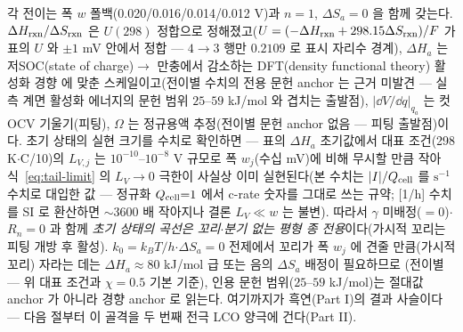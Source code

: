 각 전이는 폭 $w$ 폴백(0.020/0.016/0.014/0.012 V)과 $n=1$, $\Delta S_a=0$ 을 함께 갖는다. $\Delta H_{\mathrm{rxn}}/\Delta S_{\mathrm{rxn}}$
은 $U(298)$ 정합으로 정해졌고($U=(-\Delta H_{\mathrm{rxn}}+298.15\Delta S_{\mathrm{rxn}})/F$ 가 표의 $U$ 와 $\pm1$ mV 안에서 정합 --- $4\!\to\!3$ 행만 $0.2109$ 로 표시 자리수 경계), $\Delta H_a$ 는 저SOC(state of charge)$\to$
만충에서 감소하는 DFT(density functional theory) 활성화 경향\cite{persson2010,persson2010b} 에 맞춘
스케일이고(전이별 수치의 전용 문헌 anchor 는 근거 미발견 --- 실측 계면 활성화 에너지의 문헌 범위
$25$--$59$ kJ/mol 와 겹치는 출발점), $|\dd V/\dd q|_{q_a}$ 는 컷 OCV 기울기(피팅), $\Omega$ 는 정규용액
추정(전이별 문헌 anchor 없음 --- 피팅 출발점)이다.
초기 상태의 실현 크기를 수치로 확인하면 --- 표의 $\Delta H_a$ 초기값에서 대표 조건(298 K$\cdot$C/10)의
$L_{V,j}$ 는 $10^{-10}$--$10^{-8}$ V 규모로 폭 $w_j$(수십 mV)에 비해 무시할 만큼 작아 식~\eqref{eq:tail-limit} 의 $L_V\to0$ 극한이 사실상 이미 실현된다(본 수치는 $|I|/Q_{\mathrm{cell}}$ 를 $\mathrm s^{-1}$ 수치로 대입한 값 --- 정규화 $Q_{\mathrm{cell}}{=}1$ 에서 c-rate 숫자를 그대로 쓰는 규약; [1/h] 수치를 SI 로 환산하면 $\sim3600$ 배 작아지나 결론 $L_V\!\ll\!w$ 는 불변). 따라서 $\gamma$ 미배정($=0$)$\cdot$$R_n=0$ 과 함께 \emph{초기 상태의 곡선은 꼬리$\cdot$분기 없는 평형
종 전용}이다(가시적 꼬리는 피팅 개방 후 활성). $k_0=k_BT/h$$\cdot$$\Delta S_a{=}0$ 전제에서 꼬리가
폭 $w_j$ 에 견줄 만큼(가시적 꼬리) 자라는 데는 $\Delta H_a\approx80$ kJ/mol 급 또는 음의 $\Delta S_a$ 배정이 필요하므로
(전이별 --- 위 대표 조건과 $\chi=0.5$ 기본 기준), 인용 문헌
범위($25$--$59$ kJ/mol)는 절대값 anchor 가 아니라 경향 anchor 로 읽는다.
여기까지가 흑연(Part I)의 결과 사슬이다 --- 다음 절부터 이 골격을 두 번째 전극 LCO 양극에 건다(Part II).

